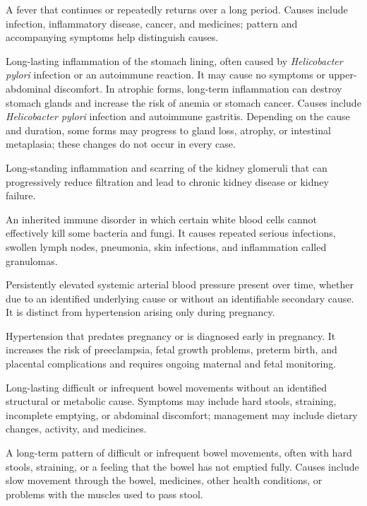  A fever that continues or repeatedly returns over a long period. Causes include infection, inflammatory disease, cancer, and medicines; pattern and accompanying symptoms help distinguish causes.

 Long-lasting inflammation of the stomach lining, often caused by \textit{Helicobacter pylori} infection or an autoimmune reaction. It may cause no symptoms or upper-abdominal discomfort. In atrophic forms, long-term inflammation can destroy stomach glands and increase the risk of anemia or stomach cancer.
Causes include \textit{Helicobacter pylori} infection and autoimmune gastritis.
Depending on the cause and duration, some forms may progress to gland loss,
atrophy, or intestinal metaplasia; these changes do not occur in every case.

 Long-standing inflammation and scarring of the kidney glomeruli that can progressively reduce filtration and lead to chronic kidney disease or kidney failure.

 An inherited immune disorder in which certain white blood cells cannot effectively kill some bacteria and fungi. It causes repeated serious infections, swollen lymph nodes, pneumonia, skin infections, and inflammation called granulomas.

 Persistently elevated systemic arterial blood pressure present over time, whether due to an identified underlying cause or without an identifiable secondary cause. It is distinct from hypertension arising only during pregnancy.

 Hypertension that predates pregnancy or is diagnosed early in pregnancy.
It increases the risk of preeclampsia, fetal growth problems, preterm birth, and placental complications and requires
ongoing maternal and fetal monitoring.

 Long-lasting difficult or infrequent bowel movements without an identified structural or metabolic cause. Symptoms may include hard stools, straining, incomplete emptying, or abdominal discomfort; management may include dietary changes, activity, and medicines.

 A long-term pattern of difficult or
  infrequent bowel movements, often with hard stools, straining, or a
  feeling that the bowel has not emptied fully. Causes include slow
  movement through the bowel, medicines, other health conditions, or
  problems with the muscles used to pass stool.

